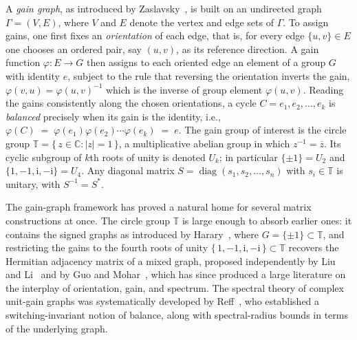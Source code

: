 \documentclass[12pt]{article}
\theoremstyle{definition}
\begin{document}
A \emph{gain graph}, as introduced by Zaslavsky~\cite{Zaslavsky, Zaslavsky1998}, is built on an undirected graph $\Gamma=(V,E)$, where $V$ and $E$ denote the vertex and edge sets of $\Gamma$. To assign gains,  one first fixes an \emph{orientation} of each edge, that is, for every edge $\{u,v\} \in E$ one chooses an ordered pair, say $(u,v)$, as its reference direction. A gain function $\varphi \colon E \to G$ then assigns to each oriented edge an element of a group $G$ with identity $e$, subject to the rule that reversing the orientation inverts the gain, $\varphi(v,u) = \varphi(u,v)^{-1}$ which is the inverse of group element $\varphi(u,v)$. Reading the gains consistently along the chosen orientations, a cycle $C = e_1, e_2, \ldots, e_k$ is \emph{balanced} precisely when its gain is the identity, i.e., $\varphi(C) \;=\; \varphi(e_1)\varphi(e_2)\cdots\varphi(e_k) \;=\; e .$
The gain group of interest is the circle group $\mathbb{T} = \{\, z \in \mathbb{C} : |z| = 1 \,\}$, a multiplicative abelian group in which $z^{-1} = \overline{z}$. Its cyclic subgroup of $k$th roots of unity is denoted $U_k$; in particular $\{\pm 1\} = U_2$ and $\{1,-1,\mathrm{i},-\mathrm{i}\} = U_4$. Any diagonal matrix $S = \operatorname{diag}(s_1,s_2,\dots,s_n)$ with $s_i \in \mathbb{T}$ is unitary, with $S^{-1} = S^{*}$.

The gain-graph framework has proved a natural home for several matrix constructions at once. The circle group $\mathbb{T}$ is large enough to absorb earlier ones: it contains the signed graphs as introduced by Harary~\cite{Harary}, where $G=\{\pm 1\} \subset \mathbb{T}$, and restricting the gains to the fourth roots of unity $\{\,1,-1,\mathrm{i},\mathrm{-i}\,\} \subset \mathbb{T}$ recovers the Hermitian adjacency matrix of a mixed graph, proposed independently by Liu and Li~\cite{LiuLi} and by Guo and Mohar~\cite{GuoMohar}, which has since produced a large literature on the interplay of orientation, gain, and spectrum. The spectral theory of complex unit-gain graphs was systematically developed by Reff~\cite{Reff}, who established a switching-invariant notion of balance, along with spectral-radius bounds in terms of the underlying graph.
\end{document}
